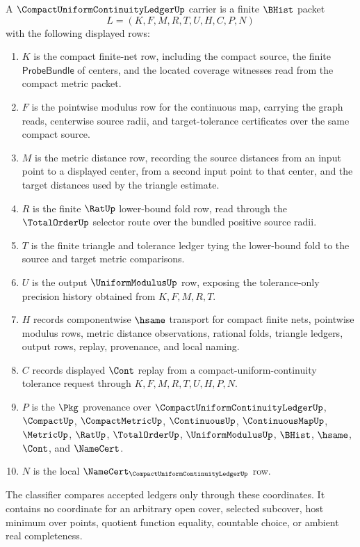 \begin{definition}
\label{def:compact-uniform-continuity-ledger-carrier}
A $\CompactUniformContinuityLedgerUp$ carrier is a finite $\BHist$ packet
$$
L=(K,F,M,R,T,U,H,C,P,N)
$$
with the following displayed rows:
\begin{enumerate}
\item $K$ is the compact finite-net row, including the compact source, the finite $\mathsf{ProbeBundle}$ of centers, and the located coverage witnesses read from the compact metric packet.
\item $F$ is the pointwise modulus row for the continuous map, carrying the graph reads, centerwise source radii, and target-tolerance certificates over the same compact source.
\item $M$ is the metric distance row, recording the source distances from an input point to a displayed center, from a second input point to that center, and the target distances used by the triangle estimate.
\item $R$ is the finite $\RatUp$ lower-bound fold row, read through the $\TotalOrderUp$ selector route over the bundled positive source radii.
\item $T$ is the finite triangle and tolerance ledger tying the lower-bound fold to the source and target metric comparisons.
\item $U$ is the output $\UniformModulusUp$ row, exposing the tolerance-only precision history obtained from $K,F,M,R,T$.
\item $H$ records componentwise $\hsame$ transport for compact finite nets, pointwise modulus rows, metric distance observations, rational folds, triangle ledgers, output rows, replay, provenance, and local naming.
\item $C$ records displayed $\Cont$ replay from a compact-uniform-continuity tolerance request through $K,F,M,R,T,U,H,P,N$.
\item $P$ is the $\Pkg$ provenance over $\CompactUniformContinuityLedgerUp$, $\CompactUp$, $\CompactMetricUp$, $\ContinuousUp$, $\ContinuousMapUp$, $\MetricUp$, $\RatUp$, $\TotalOrderUp$, $\UniformModulusUp$, $\BHist$, $\hsame$, $\Cont$, and $\NameCert$.
\item $N$ is the local $\NameCert_{\CompactUniformContinuityLedgerUp}$ row.
\end{enumerate}
The classifier compares accepted ledgers only through these coordinates. It contains no coordinate for an arbitrary open cover, selected subcover, host minimum over points, quotient function equality, countable choice, or ambient real completeness.
\end{definition}


